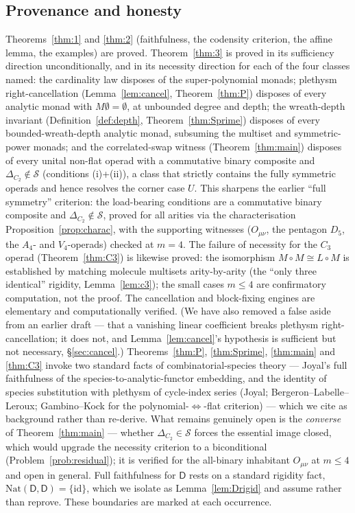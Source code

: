 \documentclass[11pt]{amsart}
\theoremstyle{plain}
\theoremstyle{definition}
\newcommand{\Nat}{\mathrm{Nat}}
\newcommand{\id}{\mathrm{id}}
\newcommand{\D}{\mathsf{D}}
\begin{document}
\subsection*{Provenance and honesty}
Theorems~\ref{thm:1} and \ref{thm:2} (faithfulness, the codensity criterion, the affine lemma, the
examples) are proved. Theorem~\ref{thm:3} is proved in its sufficiency direction unconditionally, and in
its necessity direction for each of the four classes named: the cardinality law disposes of the
super-polynomial monads; plethysm right-cancellation (Lemma~\ref{lem:cancel}, Theorem~\ref{thm:P})
disposes of every analytic monad with $M\emptyset=\emptyset$, at unbounded degree and depth; the
wreath-depth invariant (Definition~\ref{def:depth}, Theorem~\ref{thm:Sprime}) disposes of every
bounded-wreath-depth analytic monad, subsuming the multiset and symmetric-power monads; and the
correlated-swap witness (Theorem~\ref{thm:main}) disposes of every unital non-flat operad with a
commutative binary composite and $\Delta_{C_2}\notin\mathcal S$ (conditions (i)+(ii)), a class that
strictly contains the fully symmetric operads and hence resolves the
corner case $U$. This sharpens the earlier ``full symmetry'' criterion: the load-bearing conditions are a
commutative binary composite and $\Delta_{C_2}\notin\mathcal S$, proved for all arities via the
characterisation Proposition~\ref{prop:charac}, with the
supporting witnesses ($O_{\mu\nu}$, the pentagon $D_5$, the $A_4$- and $V_4$-operads) checked at $m=4$.
The failure of necessity for the $C_3$ operad (Theorem~\ref{thm:C3}) is likewise proved: the isomorphism
$M\circ M\cong L\circ M$ is established by matching molecule multisets arity-by-arity (the ``only three
identical'' rigidity, Lemma~\ref{lem:c3}); the small cases $m\le4$ are confirmatory computation, not the
proof. The cancellation and block-fixing engines are elementary and computationally verified. (We have
also removed a false aside from an earlier draft --- that a vanishing linear coefficient breaks plethysm
right-cancellation; it does not, and Lemma~\ref{lem:cancel}'s hypothesis is sufficient but not necessary,
\S\ref{sec:cancel}.) Theorems~\ref{thm:P}, \ref{thm:Sprime}, \ref{thm:main} and \ref{thm:C3} invoke two standard
facts of combinatorial-species theory --- Joyal's full faithfulness of the species-to-analytic-functor
embedding, and the identity of species substitution with plethysm of cycle-index series (Joyal;
Bergeron--Labelle--Leroux; Gambino--Kock for the polynomial-$\iff$-flat criterion) --- which we cite as
background rather than re-derive. What remains genuinely open is the \emph{converse} of
Theorem~\ref{thm:main} --- whether $\Delta_{C_2}\in\mathcal S$ forces the essential image closed, which
would upgrade the necessity criterion to a biconditional (Problem~\ref{prob:residual}); it is verified for
the all-binary inhabitant $O_{\mu\nu}$ at $m\le4$ and open in general. Full faithfulness for $\D$
rests on a standard rigidity fact, $\Nat(\D,\D)=\{\id\}$, which we isolate as Lemma~\ref{lem:Drigid} and
assume rather than reprove. These boundaries are marked at each occurrence.
\end{document}
